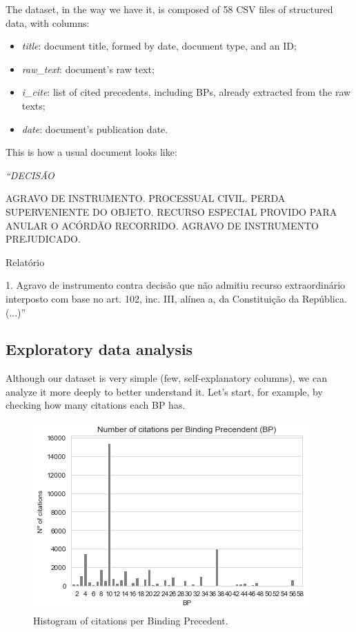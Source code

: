 \documentclass[twocolumn]{article}
\begin{document}
                  The dataset, in the way we have it, is composed of 58 CSV files of structured data, with columns:
                  \begin{itemize}
                        \item \textit{title}: document title, formed by date, document type, and an ID;
                        \item \textit{raw\_text}: document's raw text;
                        \item \textit{i\_cite}: list of cited precedents, including BPs, already extracted from the raw texts;
                        \item \textit{date}: document's publication date.
                  \end{itemize}

                  This is how a usual document looks like:

                  \bigskip

                  {\itshape``DECISÃO

                  AGRAVO DE INSTRUMENTO. PROCESSUAL CIVIL. PERDA SUPERVENIENTE DO OBJETO. RECURSO ESPECIAL PROVIDO PARA ANULAR O ACÓRDÃO RECORRIDO. AGRAVO DE INSTRUMENTO PREJUDICADO.

                  Relatório

                  1. Agravo de instrumento contra decisão que não admitiu recurso extraordinário interposto com base no art. 102, inc. III, alínea a, da Constituição da República. (...)''}

            \subsection{Exploratory data analysis}

                  Although our dataset is very simple (few, self-explanatory columns), we can analyze it more deeply to better understand it. Let's start, for example, by checking how many citations each BP has.

                  \begin{figure}[!h]
                        \includegraphics[width=\linewidth]{bp_citations.png}
                        \caption{Histogram of citations per Binding Precedent.}
                        \label{fig:bp_citations}
                  \end{figure}
\end{document}
